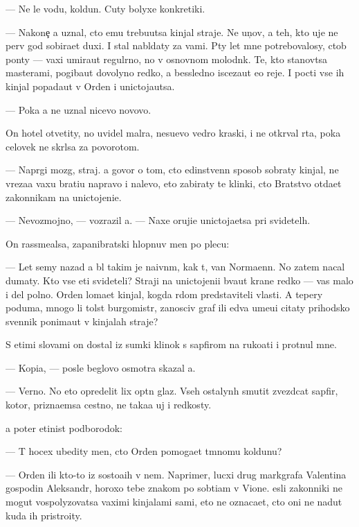 \documentclass[10pt]{book}
\begin{document}
— Ne le{\y} vodu, koldun. Cuty bolyxe konkretiki.

— Nakone{\c} {\y}a uznal, cto {\y}emu trebu{\y}utsa kinjal{\yi} straje{\y}. Ne {\y}un{\c}ov, a teh, kto uje ne perv{\yi}{\y} god sobira{\y}et duxi. I stal nabl{\iu}daty za vami. P{\ia}ty let mne potrebovalosy, ctob{\yi} pon{\ia}ty — vaxi umira{\y}ut regul{\ia}rno, no v osnovnom molodn{\ia}k. Te, kto stanov{\ia}tsa masterami, pogiba{\y}ut dovolyno redko, a bessledno isceza{\y}ut {\y}e{\x}o reje. I pocti vse ih kinjal{\yi} popada{\y}ut v Orden i unictoja{\y}utsa.

— Poka {\y}a ne uznal nicevo novovo.

On hotel otvetity, no uvidel mal{\ia}ra, nesu{\x}evo vedro kraski, i ne otkr{\yi}val rta, poka celovek ne skr{\yi}lsa za povorotom.

— Napr{\ia}gi mozg, straj. {\Y}a govor{\iu} o tom, cto {\y}edinstvenn{\yi}{\y} sposob sobraty kinjal{\yi}, ne v{\yi}reza{\y}a vaxu brati{\y}u napravo i nalevo, eto zabiraty te klinki, cto Bratstvo otda{\y}et zakonnikam na unictojeni{\y}e.

— Nevozmojno, — vozrazil {\y}a. — Naxe oruji{\y}e unictoja{\y}etsa pri svidetel{\ia}h.

On rassme{\y}alsa, zapanibratski hlopnuv men{\ia} po plecu:

— Let semy nazad {\y}a b{\yi}l takim je naivn{\yi}m, kak t{\yi}, van Normaenn. No zatem nacal dumaty. Kto vse eti svideteli? Straji na unictojeni{\y}i b{\yi}va{\y}ut kra{\y}ne redko — vas malo i del polno. Orden loma{\y}et kinjal, kogda r{\ia}dom predstaviteli vlasti. A tepery poduma{\y}, mnogo li tolst{\yi}{\y} burgomistr, zanosciv{\yi}{\y} graf ili {\y}edva ume{\y}u{\x}i{\y} citaty prihodsko{\y} sv{\ia}{\x}ennik ponima{\y}ut v kinjalah straje{\y}?

S etimi slovami on dostal iz sumki klinok s sapfirom na ruko{\y}ati i prot{\ia}nul mne.

— Kopi{\y}a, — posle beglovo osmotra skazal {\y}a.

— Verno. No eto opredelit lix op{\yi}tn{\yi}{\y} glaz. Vseh ostalyn{\yi}h smutit zvezdcat{\yi}{\y} sapfir, kotor{\yi}{\y}, prizna{\y}emsa cestno, ne taka{\y}a uj i redkosty.

{\Y}a poter {\x}etinist{\yi}{\y} podborodok:

— T{\yi} hocex ubedity men{\ia}, cto Orden pomoga{\y}et t{\e}mnomu koldunu?

— Orden ili kto-to iz sosto{\y}a{\x}ih v nem. Naprimer, lucxi{\y} drug markgrafa Valentina gospodin Aleksandr, horoxo tebe znakom{\yi}{\y} po sob{\yi}ti{\y}am v Vione. {\Y}esli zakonniki ne mogut vospolyzovatsa vaximi kinjalami sami, eto ne oznaca{\y}et, cto oni ne na{\y}dut kuda ih pristro{\y}ity.
\end{document}
